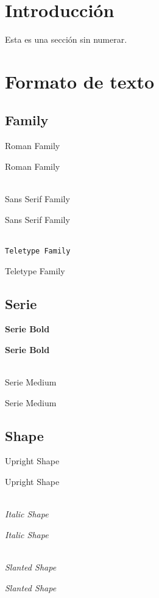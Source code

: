 \documentclass[12pt,a4paper]{article}
\begin{document}
\section*{Introducción}

Esta es una sección sin numerar.

\section{Formato de texto}

\subsection{Family}

\textrm{Roman Family}

{\rmfamily Roman Family}

~\\

\textsf{Sans Serif Family}

{\sffamily Sans Serif Family}

~\\

\texttt{Teletype Family}

{\ttfamily Teletype Family}

\subsection{Serie}

\textbf{Serie Bold}

{\bfseries Serie Bold}

~\\

\textmd{Serie Medium}

{\mdseries Serie Medium}

\subsection{Shape}

\textup{Upright Shape}

{\upshape Upright Shape}

~\\

\textit{Italic Shape}

{\itshape Italic Shape}

~\\

\textsl{Slanted Shape}

{\slshape Slanted Shape}
\end{document}
